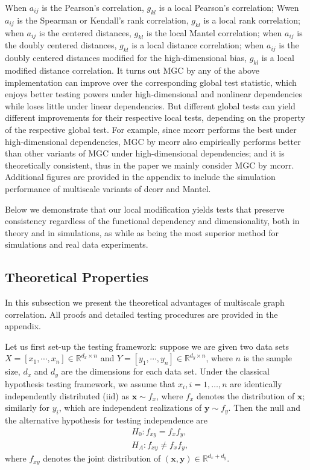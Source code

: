 \documentclass[11pt]{article}
\providecommand{\mb}[1]{\boldsymbol{#1}}
\newcommand{\Real}{\mathbb{R}}
\begin{document}
When $a_{ij}$ is the Pearson's correlation, $g_{kl}$ is a local Pearson's correlation;
Wwen $a_{ij}$ is the Spearman or Kendall's rank correlation, $g_{kl}$ is a local rank correlation;
when $a_{ij}$ is the centered distances, $g_{kl}$ is the local Mantel correlation;
when $a_{ij}$ is the doubly centered distances, $g_{kl}$ is a local distance correlation;
when $a_{ij}$ is the doubly centered distances modified for the high-dimensional bias, $g_{kl}$ is a local modified distance correlation.  
It turns out MGC by any of the above implementation can improve over the corresponding global test statistic, which enjoys better testing powers under high-dimensional and nonlinear dependencies while loses little under linear dependencies. But different global tests can yield different improvements for their respective local tests, depending on the property of the respective global test. For example, since mcorr performs the best under high-dimensional dependencies, MGC by mcorr also empirically performs better than other variants of MGC under high-dimensional dependencies; and it is theoretically consistent, thus in the paper we mainly consider MGC by mcorr. Additional figures are provided in the appendix to include the simulation performance of multiscale variants of dcorr and Mantel. 

Below we demonstrate that our local modification yields tests that preserve consistency regardless of the functional dependency and dimensionality, both in theory and in simulations, as while as being the most superior method for simulations and real data experiments.

\subsection{Theoretical Properties}
\label{main4}
In this subsection we present the theoretical advantages of multiscale graph correlation. All proofs and detailed testing procedures are provided in the appendix. 

Let us first set-up the testing framework: suppose we are given two data sets $X=[x_{1},\cdots, x_{n}] \in \Real^{d_{x} \times n}$ and $Y=[y_{1},\cdots, y_{n}] \in \Real^{d_{y} \times n}$, where $n$ is the sample size, $d_{x}$ and $d_{y}$ are the dimensions for each data set. Under the classical hypothesis testing framework, we assume that $x_{i}, i=1,\ldots,n$ are identically independently distributed (iid) as $\mb{x} \sim f_{x}$, where $f_{x}$ denotes the distribution of $\mb{x}$; similarly for $y_{i}$, which are independent realizations of $\mb{y} \sim f_{y}$. Then the null and the alternative hypothesis for testing independence are
\begin{align*}
& H_{0}: f_{xy}=f_{x}f_{y},\\
& H_{A}: f_{xy} \neq f_{x}f_{y},
\end{align*}
where $f_{xy}$ denotes the joint distribution of $(\mb{x},\mb{y}) \in \Real^{d_{x} + d_{y}}$. 
\end{document}
